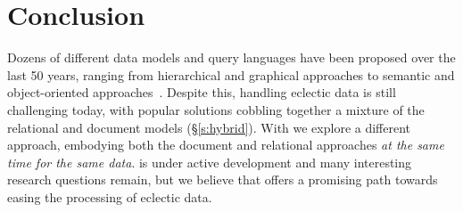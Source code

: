 \vspace{-0.7em}

\section{Conclusion}

Dozens of different data models and query languages have been proposed over the last 50 years, ranging from hierarchical and graphical approaches to semantic and object-oriented approaches~\cite{what_goes_around}. Despite this, handling eclectic data is still challenging today, with popular solutions cobbling together a mixture of the relational and document models (\S\ref{s:hybrid}). With \sys{} we explore a different approach, embodying both the document and relational approaches {\em at the same time for the same data}. \sys{} is under active development and many interesting research questions remain, but we believe that \sys{} offers a promising path towards easing the processing of eclectic data.




\vspace{-0.7em}